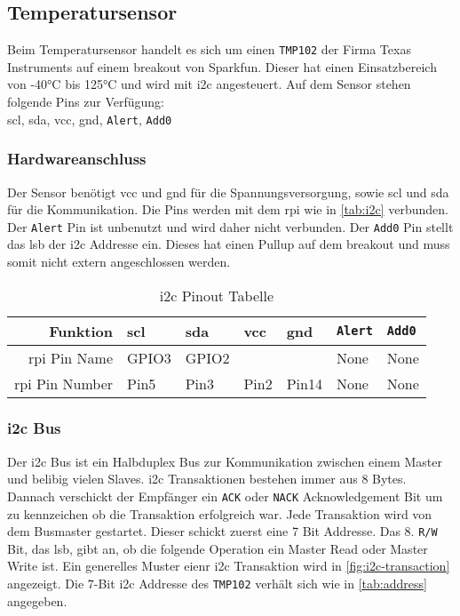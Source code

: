 \subsection{Temperatursensor}

Beim Temperatursensor handelt es sich um einen \texttt{TMP102} der Firma Texas Instruments auf einem \gls{breakout} von Sparkfun.
Dieser hat einen Einsatzbereich von -40\si{\celsius} bis 125\si{\celsius} und wird mit \gls{i2c} angesteuert.
Auf dem Sensor stehen folgende Pins zur Verfügung: \\
\gls{scl}, \gls{sda}, \gls{vcc}, \gls{gnd}, \texttt{Alert}, \texttt{Add0}

\subsubsection{Hardwareanschluss}

Der Sensor benötigt \gls{vcc} und \gls{gnd} für die Spannungsversorgung, sowie \gls{scl} und \gls{sda} für die Kommunikation.
Die Pins werden mit dem \gls{rpi} wie in \autoref{tab:i2c} verbunden.
Der \texttt{Alert} Pin ist unbenutzt und wird daher nicht verbunden.
Der \texttt{Add0} Pin stellt das \gls{lsb} der \gls{i2c} Addresse ein.
Dieses hat einen Pullup auf dem \gls{breakout} und muss somit nicht extern angeschlossen werden.

\begin{table}[h]
    \centering
    \begin{tabular}{|r||l|l|l|l|l|l|}
        \hline
        \textbf{Funktion} & \textbf{\gls{scl}} & \textbf{\gls{sda}} & \textbf{\gls{vcc}} & \textbf{\gls{gnd}} & \textbf{\texttt{Alert}} & \textbf{\texttt{Add0}}\\
        \hline
        \hline
        \gls{rpi} Pin Name & GPIO3 & GPIO2 & & & None & None \\
        \hline
        \gls{rpi} Pin Number & Pin5 & Pin3 & Pin2 & Pin14 & None & None \\
        \hline
    \end{tabular}
    \caption{\gls{i2c} Pinout Tabelle}
    \label{tab:i2c}
\end{table}

\subsubsection{\acrshort{i2c} Bus}

Der \gls{i2c} Bus ist ein Halbduplex Bus zur Kommunikation zwischen einem Master und belibig vielen Slaves.
\gls{i2c} Transaktionen bestehen immer aus 8 Bytes.
Dannach verschickt der Empfänger ein \texttt{ACK} oder \texttt{NACK} Acknowledgement Bit um zu kennzeichen ob die Transaktion erfolgreich war.
Jede Transaktion wird von dem Busmaster gestartet.
Dieser schickt zuerst eine 7 Bit Addresse. Das 8. \texttt{R/W} Bit, das \gls{lsb}, gibt an, ob die folgende Operation ein Master Read oder Master Write ist.
Ein generelles Muster eienr \gls{i2c} Transaktion wird in \autoref{fig:i2c-transaction} angezeigt.
Die $7$-Bit \gls{i2c} Addresse des \texttt{TMP102} verhält sich wie in \autoref{tab:address} angegeben.

